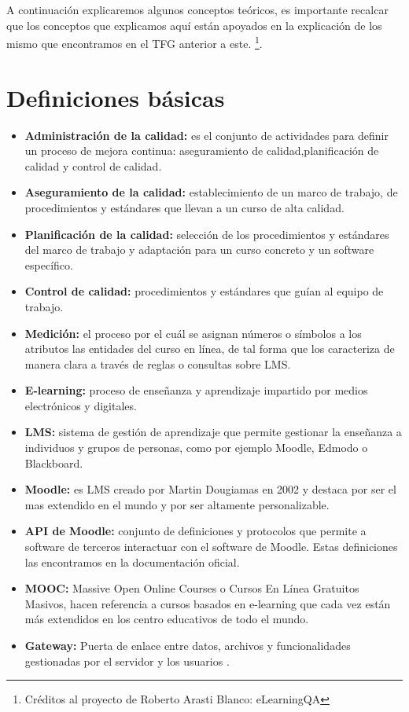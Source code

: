 
A continuación explicaremos algunos conceptos teóricos, es importante recalcar que los conceptos que explicamos aquí están apoyados en la explicación de los mismo que encontramos en el TFG anterior a este. \footnote{Créditos al proyecto de Roberto Arasti Blanco: eLearningQA\label{tfg-RobertoArasto}}.

\section{Definiciones básicas}
\begin{itemize}
	\item \textbf{Administración de la calidad:} es el conjunto de actividades para definir un proceso de mejora continua: aseguramiento de calidad,planificación de calidad y control de calidad.
	\item \textbf{Aseguramiento de la calidad:} establecimiento de un marco de trabajo, de procedimientos y estándares que llevan a un curso de alta calidad.
    \item \textbf{Planificación de la calidad:} selección de los procedimientos y estándares del marco de trabajo y adaptación para un curso concreto y un software específico.
    \item \textbf{Control de calidad:} procedimientos y estándares que guían al equipo de trabajo.
    \item \textbf{Medición:} el proceso por el cuál se asignan números o símbolos a los atributos las entidades del curso en línea, de tal forma que los caracteriza de manera clara a través de reglas o consultas sobre LMS.
    \item \textbf{E-learning:} proceso de enseñanza y aprendizaje impartido por medios electrónicos y digitales.
    \item \textbf{LMS:} sistema de gestión de aprendizaje que permite gestionar la enseñanza a individuos y grupos de personas, como por ejemplo Moodle, Edmodo o Blackboard.
    \item \textbf{Moodle:} es LMS creado por Martin Dougiamas en 2002 y destaca por ser el mas extendido en el mundo y por ser altamente personalizable.
    \item \textbf{API de Moodle:} conjunto de definiciones y protocolos que permite a software de terceros interactuar con el software de Moodle. Estas definiciones las encontramos en la documentación oficial\cite{moodle-api}.
    \item \textbf{MOOC:} Massive Open Online Courses o Cursos En Línea Gratuitos Masivos, hacen referencia a cursos basados en e-learning que cada vez están más extendidos en los centro educativos de todo el mundo.
    \item \textbf{Gateway:} Puerta de enlace entre datos, archivos y funcionalidades gestionadas por el servidor y los usuarios \cite{gateway}.
\end{itemize}


